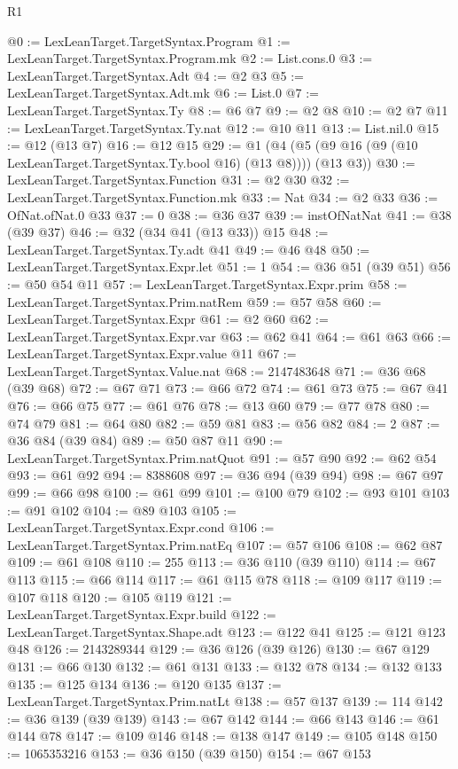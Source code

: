 \begin{lexlean}{R1}
\begin{coremodule}
@0 := LexLeanTarget.TargetSyntax.Program
@1 := LexLeanTarget.TargetSyntax.Program.mk
@2 := List.cons.{0}
@3 := LexLeanTarget.TargetSyntax.Adt
@4 := @2 @3
@5 := LexLeanTarget.TargetSyntax.Adt.mk
@6 := List.{0}
@7 := LexLeanTarget.TargetSyntax.Ty
@8 := @6 @7
@9 := @2 @8
@10 := @2 @7
@11 := LexLeanTarget.TargetSyntax.Ty.nat
@12 := @10 @11
@13 := List.nil.{0}
@15 := @12 (@13 @7)
@16 := @12 @15
@29 := @1 (@4 (@5 (@9 @16 (@9 (@10 LexLeanTarget.TargetSyntax.Ty.bool @16) (@13 @8)))) (@13 @3))
@30 := LexLeanTarget.TargetSyntax.Function
@31 := @2 @30
@32 := LexLeanTarget.TargetSyntax.Function.mk
@33 := Nat
@34 := @2 @33
@36 := OfNat.ofNat.{0} @33
@37 := 0
@38 := @36 @37
@39 := instOfNatNat
@41 := @38 (@39 @37)
@46 := @32 (@34 @41 (@13 @33)) @15
@48 := LexLeanTarget.TargetSyntax.Ty.adt @41
@49 := @46 @48
@50 := LexLeanTarget.TargetSyntax.Expr.let
@51 := 1
@54 := @36 @51 (@39 @51)
@56 := @50 @54 @11
@57 := LexLeanTarget.TargetSyntax.Expr.prim
@58 := LexLeanTarget.TargetSyntax.Prim.natRem
@59 := @57 @58
@60 := LexLeanTarget.TargetSyntax.Expr
@61 := @2 @60
@62 := LexLeanTarget.TargetSyntax.Expr.var
@63 := @62 @41
@64 := @61 @63
@66 := LexLeanTarget.TargetSyntax.Expr.value @11
@67 := LexLeanTarget.TargetSyntax.Value.nat
@68 := 2147483648
@71 := @36 @68 (@39 @68)
@72 := @67 @71
@73 := @66 @72
@74 := @61 @73
@75 := @67 @41
@76 := @66 @75
@77 := @61 @76
@78 := @13 @60
@79 := @77 @78
@80 := @74 @79
@81 := @64 @80
@82 := @59 @81
@83 := @56 @82
@84 := 2
@87 := @36 @84 (@39 @84)
@89 := @50 @87 @11
@90 := LexLeanTarget.TargetSyntax.Prim.natQuot
@91 := @57 @90
@92 := @62 @54
@93 := @61 @92
@94 := 8388608
@97 := @36 @94 (@39 @94)
@98 := @67 @97
@99 := @66 @98
@100 := @61 @99
@101 := @100 @79
@102 := @93 @101
@103 := @91 @102
@104 := @89 @103
@105 := LexLeanTarget.TargetSyntax.Expr.cond
@106 := LexLeanTarget.TargetSyntax.Prim.natEq
@107 := @57 @106
@108 := @62 @87
@109 := @61 @108
@110 := 255
@113 := @36 @110 (@39 @110)
@114 := @67 @113
@115 := @66 @114
@117 := @61 @115 @78
@118 := @109 @117
@119 := @107 @118
@120 := @105 @119
@121 := LexLeanTarget.TargetSyntax.Expr.build
@122 := LexLeanTarget.TargetSyntax.Shape.adt
@123 := @122 @41
@125 := @121 @123 @48
@126 := 2143289344
@129 := @36 @126 (@39 @126)
@130 := @67 @129
@131 := @66 @130
@132 := @61 @131
@133 := @132 @78
@134 := @132 @133
@135 := @125 @134
@136 := @120 @135
@137 := LexLeanTarget.TargetSyntax.Prim.natLt
@138 := @57 @137
@139 := 114
@142 := @36 @139 (@39 @139)
@143 := @67 @142
@144 := @66 @143
@146 := @61 @144 @78
@147 := @109 @146
@148 := @138 @147
@149 := @105 @148
@150 := 1065353216
@153 := @36 @150 (@39 @150)
@154 := @67 @153

\end{coremodule}
\end{lexlean}
